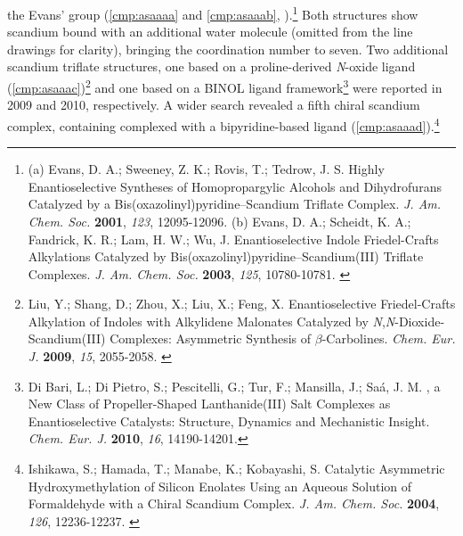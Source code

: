  the Evans' group (\ref{cmp:asaaaa} and \ref{cmp:asaaab}, ).\footnote{ (a)
 {\frenchspacing Evans, D.
 A.; Sweeney, Z.
 K.; Rovis, T.; Tedrow, J. S. Highly Enantioselective Syntheses of Homopropargylic Alcohols and Dihydrofurans Catalyzed by a Bis(oxazolinyl)pyridine--Scandium Triflate Complex. \textit{J. Am. Chem. Soc.} \textbf{2001},
 \textit{123}, 12095-12096.} (b) {\frenchspacing Evans, D. A.; Scheidt, K. A.; Fandrick, K. R.; Lam,
 H. W.; Wu, J. Enantioselective Indole Friedel-Crafts Alkylations Catalyzed by
 Bis(oxazolinyl)pyridine--Scandium(III) Triflate Complexes. \textit{J. Am. Chem. Soc.}
 \textbf{2003}, \textit{125}, 10780-10781.} \label{ref:asevans}} Both structures show scandium bound
 with an additional water molecule (omitted from the line drawings for clarity), bringing the
 coordination number to seven.
 Two additional scandium triflate structures, one based on a proline-derived
 \textit{N}-oxide ligand (\ref{cmp:asaaac})\footnote{{\frenchspacing Liu, Y.;
 Shang, D.; Zhou, X.; Liu, X.; Feng, X. Enantioselective Friedel-Crafts Alkylation of Indoles with
 Alkylidene Malonates Catalyzed by \textit{N},\textit{N}-Dioxide-Scandium(III) Complexes:
 Asymmetric Synthesis of $\beta$-Carbolines. \textit{Chem. Eur. J.} \textbf{2009}, \textit{15},
 2055-2058.} \label{ref:asfengstructure}} and one based on a BINOL ligand
 framework\footnote{{\frenchspacing Di Bari, L.; Di Pietro, S.; Pescitelli, G.; Tur, F.; Mansilla,
 J.; Sa\'{a}, J. M. , a New Class of Propeller-Shaped Lanthanide(III) Salt
 Complexes as Enantioselective Catalysts: Structure, Dynamics and Mechanistic Insight. \textit{Chem.
 Eur. J.} \textbf{2010}, \textit{16}, 14190-14201.}} were reported in 2009 and 2010, respectively. A
 wider search revealed a fifth chiral scandium complex, containing  complexed with a
 bipyridine-based ligand (\ref{cmp:asaaad}).\footnote{{\frenchspacing Ishikawa,
 S.; Hamada, T.; Manabe, K.; Kobayashi, S.
 Catalytic Asymmetric Hydroxymethylation of Silicon Enolates Using an Aqueous Solution of Formaldehyde with a Chiral Scandium Complex. \textit{J. Am. Chem. Soc.}
 \textbf{2004}, \textit{126}, 12236-12237.} \label{ref:askobayashistructure}} 
 
